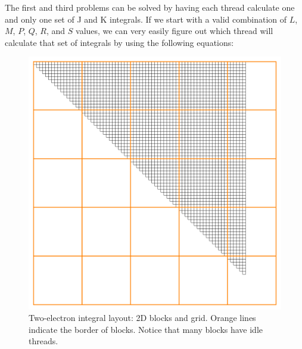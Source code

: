 The first and third problems can be solved by having each thread calculate one and only one set of J and K integrals. If we start with a valid combination of $L$, $M$, $P$, $Q$, $R$, and $S$ values, we can very easily figure out which thread will calculate that set of integrals by using the following equations:

\begin{figure}[h!]
\includegraphics[width=1\textwidth]{Figures/gen_mat_block_layout.png}
\caption[Two-electron integral layout: 2D blocks and grid]
{Two-electron integral layout: 2D blocks and grid. Orange lines indicate the border of blocks. Notice that many blocks have idle threads.}
\label{fig:genmatblock}
\end{figure}

